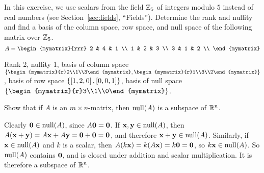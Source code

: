 \begin{ex}
  In this exercise, we use scalars from the field $\mathbb{Z}_5$ of integers
  modulo $5$ instead of real numbers (see Section~\ref{sec:fields},
  ``Fields'').  Determine the rank and nullity and find a basis of the
  column space, row space, and null space of the following matrix over
  $\mathbb{Z}_5$.
  \begin{equation*}
    A = \begin{mymatrix}{rrr}
      2 & 4 & 1 \\
      1 & 2 & 3 \\
      3 & 1 & 2 \\
    \end{mymatrix}
  \end{equation*}
  \begin{sol}
    Rank 2, nullity 1, basis of column space
    $\set{\begin{mymatrix}{r}2\\1\\3\end{mymatrix},
    \begin{mymatrix}{r}1\\3\\2\end{mymatrix}}$, basis of row space
    $\left\{\left[1,2,0\right], \left[0,0,1\right]\right\}$, basis of null space
    $\set{\begin{mymatrix}{r}3\\1\\0\end{mymatrix}}$.
  \end{sol}
\end{ex}

\begin{ex}
  Show that if $A$ is an $m\times n$-matrix, then $\nullspace(A)$
  is a subspace of $\mathbb{R}^n$.
  \begin{sol}
    Clearly $\vect{0}\in\nullspace(A)$, since $A\vect{0}=\vect{0}$.
    If $\vect{x},\vect{y}\in\nullspace(A)$, then
    $A(\vect{x}+\vect{y}) = A\vect{x}+A\vect{y} = \vect{0}+\vect{0} =
    \vect{0}$, and therefore
    $\vect{x}+\vect{y}\in\nullspace(A)$. Similarly, if
    $\vect{x}\in\nullspace(A)$ and $k$ is a scalar, then
    $A(k\vect{x})=k(A\vect{x})=k\vect{0}=\vect{0}$, so
    $k\vect{x}\in\nullspace(A)$. So $\nullspace(A)$ contains
    $\vect{0}$, and is closed under addition and scalar
    multiplication. It is therefore a subspace of $\mathbb{R}^n$.
  \end{sol}
\end{ex}

